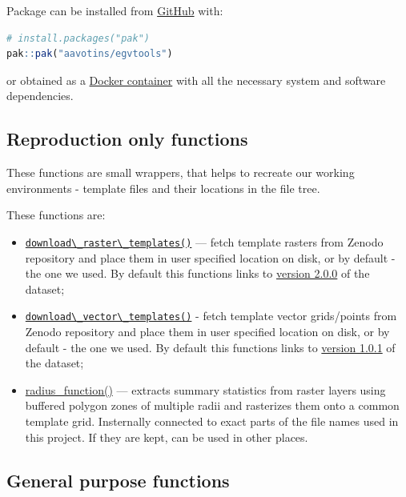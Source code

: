 \documentclass[
]{book}
\newcommand{\passthrough}[1]{#1}
\begin{document}
Package can be installed from \href{https://github.com/aavotins/egvtools}{GitHub} with:

\begin{lstlisting}[language=R]
# install.packages("pak")
pak::pak("aavotins/egvtools")
\end{lstlisting}

or obtained as a \href{https://hub.docker.com/repository/docker/aavotins/hiqbiodiv-container/general}{Docker container} with all the necessary system and software dependencies.

\subsection{Reproduction only functions}\label{Ch02.01.01}

These functions are small wrappers, that helps to recreate our
working environments - template files and their locations in the file tree.

These functions are:

\begin{itemize}
\item
  \href{https://aavotins.github.io/egvtools/reference/download_raster_templates.html}{\passthrough{\lstinline!download\_raster\_templates()!}} --- fetch template rasters from Zenodo repository
  and place them in user specified location on disk, or by default - the
  one we used. By default this functions links
  to \href{https://zenodo.org/records/14497070}{version 2.0.0} of the dataset;
\item
  \href{https://aavotins.github.io/egvtools/reference/download_vector_templates.html}{\passthrough{\lstinline!download\_vector\_templates()!}} - fetch template vector grids/points from Zenodo
  repository and place them in user specified location on disk, or by default - the
  one we used. By default this functions links
  to \href{https://zenodo.org/records/14277114}{version 1.0.1} of the dataset;
\item
  \href{https://aavotins.github.io/egvtools/reference/radius_function.html}{radius\_function()} --- extracts
  summary statistics from raster layers using buffered polygon zones of multiple
  radii and rasterizes them onto a common template grid. Insternally connected to
  exact parts of the file names used in this project. If they are kept, can
  be used in other places.
\end{itemize}

\subsection{General purpose functions}\label{Ch02.01.02}
\end{document}
